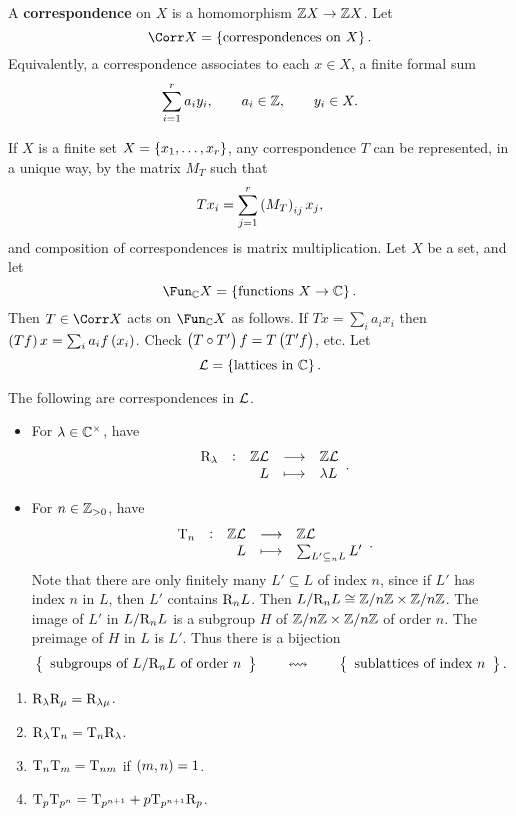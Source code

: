 \begin{definition}
A \textbf{correspondence} on $ X $ is a homomorphism $ \mathbb{Z} X \to \mathbb{Z} X $. Let
$$ \Corr X = \cbr{\text{correspondences on} \ X}. $$
Equivalently, a correspondence associates to each $ x \in X $, a finite formal sum
$$ \sum_{i = 1}^r a_iy_i, \qquad a_i \in \mathbb{Z}, \qquad y_i \in X. $$
\end{definition}

If $ X $ is a finite set $ X = \cbr{x_1, \dots, x_r} $, any correspondence $ T $ can be represented, in a unique way, by the matrix $ M_T $ such that
$$ Tx_i = \sum_{j = 1}^r \br{M_T}_{ij}x_j, $$
and composition of correspondences is matrix multiplication. Let $ X $ be a set, and let
$$ \Fun_\CC X = \cbr{\text{functions} \ X \to \CC}. $$
Then $ T \in \Corr X $ acts on $ \Fun_\CC X $ as follows. If $ Tx = \sum_i a_ix_i $ then $ \br{Tf}x = \sum_i a_if\br{x_i} $. Check $ \br{T \circ T'}f = T\br{T'f} $, etc. Let
$$ \LLL = \cbr{\text{lattices in} \ \CC}. $$

\pagebreak

\begin{example*}
The following are correspondences in $ \mathcal{L} $.
\begin{itemize}
\item For $ \lambda \in \mathbb{C}^\times $, have
$$ \function[\R_\lambda]{\ZZ\LLL}{\ZZ\LLL}{L}{\lambda L}. $$
\item For $ n \in \mathbb{Z}_{> 0} $, have
$$ \function[\T_n]{\ZZ\LLL}{\ZZ\LLL}{L}{\sum_{L' \subseteq_n L} L'}. $$
Note that there are only finitely many $ L' \subseteq L $ of index $ n $, since if $ L' $ has index $ n $ in $ L $, then $ L' $ contains $ \mathrm{R}_nL $. Then $ L / \mathrm{R}_nL \cong \mathbb{Z} / n\mathbb{Z} \times \mathbb{Z} / n\mathbb{Z} $. The image of $ L' $ in $ L / \mathrm{R}_nL $ is a subgroup $ H $ of $ \mathbb{Z} / n\mathbb{Z} \times \mathbb{Z} / n\mathbb{Z} $ of order $ n $. The preimage of $ H $ in $ L $ is $ L' $. Thus there is a bijection
$$ \correspondence{\text{subgroups of} \ L / \R_nL \ \text{of order} \ n}{\text{sublattices of index} \ n}. $$
\end{itemize}
\end{example*}

\begin{proposition}
\label{prop:correspondence}
\hfill
\begin{enumerate}
\item $ \mathrm{R}_\lambda\mathrm{R}_\mu = \mathrm{R}_{\lambda\mu} $.
\item $ \mathrm{R}_\lambda\mathrm{T}_n = \mathrm{T}_n\mathrm{R}_\lambda $.
\item $ \mathrm{T}_n\mathrm{T}_m = \mathrm{T}_{nm} $ if $ \br{m, n} = 1 $.
\item $ \mathrm{T}_p\mathrm{T}_{p^n} = \mathrm{T}_{p^{n + 1}} + p\mathrm{T}_{p^{n + 1}}\mathrm{R}_p $.
\end{enumerate}
\end{proposition}

